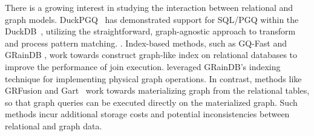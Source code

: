  There is a growing interest in studying the interaction between relational and graph models.
DuckPGQ~\cite{DuckPGQ,DuckPGQ-VLDB} has demonstrated support for SQL/PGQ within the DuckDB~\cite{duckdb}, utilizing the straightforward, graph-agnostic approach to transform and process pattern matching.
.
Index-based methods, such as GQ-Fast \cite{gqfast} and GRainDB \cite{graindb}, work towards construct graph-like index on relational databases to improve the performance of join execution. \name leveraged GRainDB's indexing technique for implementing physical graph operations. In contrast, methods like GRFusion \cite{GRFusion} and Gart~\cite{gart} work towards materializing graph from the relational tables,
so that graph queries can be executed directly on the materialized graph. Such methods incur additional storage costs and potential inconsistencies between relational and graph data.






